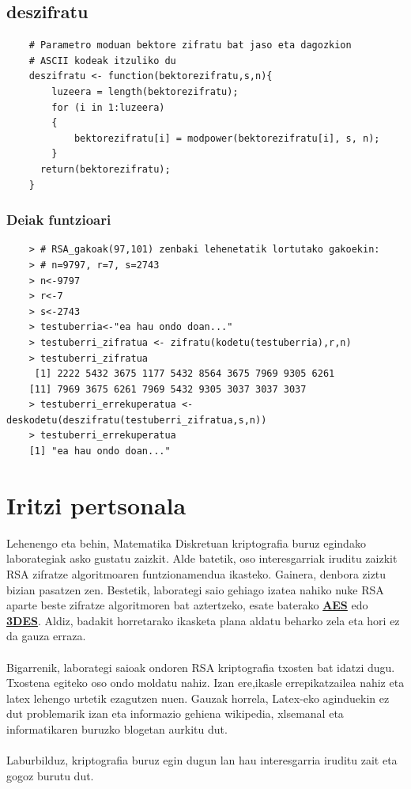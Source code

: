 \documentclass[12pt]{basque-book}
\begin{document}
\newpage

\section{deszifratu}
\begin{verbatim}
    # Parametro moduan bektore zifratu bat jaso eta dagozkion 
    # ASCII kodeak itzuliko du
    deszifratu <- function(bektorezifratu,s,n){
        luzeera = length(bektorezifratu);
        for (i in 1:luzeera)
        {
            bektorezifratu[i] = modpower(bektorezifratu[i], s, n);
        }
      return(bektorezifratu);
    }
\end{verbatim}

\subsection{Deiak funtzioari}
\begin{verbatim}
    > # RSA_gakoak(97,101) zenbaki lehenetatik lortutako gakoekin:
    > # n=9797, r=7, s=2743
    > n<-9797
    > r<-7
    > s<-2743
    > testuberria<-"ea hau ondo doan..."
    > testuberri_zifratua <- zifratu(kodetu(testuberria),r,n)
    > testuberri_zifratua
     [1] 2222 5432 3675 1177 5432 8564 3675 7969 9305 6261
    [11] 7969 3675 6261 7969 5432 9305 3037 3037 3037
    > testuberri_errekuperatua <- deskodetu(deszifratu(testuberri_zifratua,s,n))
    > testuberri_errekuperatua
    [1] "ea hau ondo doan..."
\end{verbatim}


\chapter{Iritzi pertsonala}

Lehenengo eta behin, Matematika Diskretuan kriptografia buruz egindako laborategiak asko gustatu zaizkit. Alde batetik, oso interesgarriak iruditu zaizkit RSA zifratze algoritmoaren funtzionamendua ikasteko. Gainera, denbora ziztu bizian pasatzen zen. Bestetik, laborategi saio gehiago izatea nahiko nuke RSA aparte beste zifratze algoritmoren bat aztertzeko, esate baterako \href{https://eu.wikipedia.org/wiki/Advanced_Encryption_Standard}{\textbf{AES}} edo \href{https://eu.wikipedia.org/wiki/DES_Hirukoitza}{\textbf{3DES}}. Aldiz, badakit horretarako ikasketa plana aldatu beharko zela eta hori ez da gauza erraza.
\\\\
Bigarrenik, laborategi saioak ondoren RSA kriptografia txosten bat idatzi dugu. Txostena egiteko oso ondo moldatu nahiz. Izan ere,ikasle errepikatzailea nahiz eta latex lehengo urtetik ezagutzen nuen. Gauzak horrela, Latex-eko aginduekin ez dut problemarik izan eta informazio gehiena wikipedia, xlsemanal eta informatikaren buruzko blogetan aurkitu dut.
\\\\
Laburbilduz, kriptografia buruz egin dugun lan hau interesgarria iruditu zait eta gogoz burutu dut.
\end{document}
